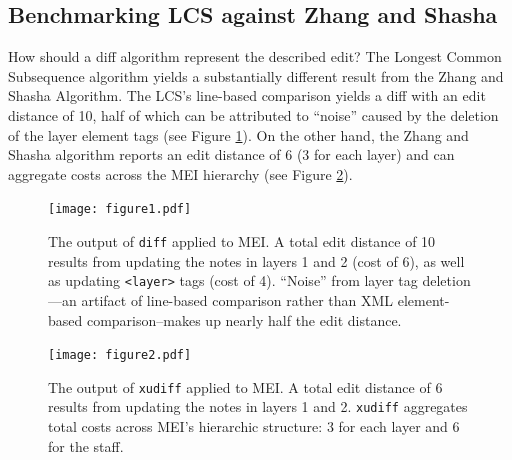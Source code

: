 \documentclass{article}
\begin{document}
\subsection{Benchmarking LCS against Zhang and Shasha}
How should a diff algorithm represent the described edit?
The Longest Common Subsequence algorithm yields a substantially different result from the Zhang and Shasha Algorithm.
The LCS's line-based comparison yields a diff with an edit distance of 10,
half of which can be attributed to ``noise'' caused by the deletion of the layer element tags (see Figure \ref{fig:lcs_diff}).
On the other hand, the Zhang and Shasha algorithm reports an edit distance of 6 (3 for each layer)
and can aggregate costs across the MEI hierarchy (see Figure \ref{fig:xudiff_diff}).

\begin{figure}[!htb]
\centering
\texttt{[image: figure1.pdf]}
\caption{The output of \texttt{diff} applied to MEI. A total edit distance of 10 results from updating the notes in layers 1 and 2 (cost of 6), as well as updating \texttt{<layer>} tags (cost of 4). ``Noise'' from layer tag deletion---an artifact of line-based comparison rather than XML element-based comparison--makes up nearly half the edit distance.}
\label{fig:lcs_diff}
\end{figure}

\begin{figure}[!htb]
\centering
\texttt{[image: figure2.pdf]}
\caption{The output of \texttt{xudiff} applied to MEI. A total edit distance of 6 results from updating the notes in layers 1 and 2. \texttt{xudiff} aggregates total costs across MEI's hierarchic structure: 3 for each layer and 6 for the staff.}
\label{fig:xudiff_diff}
\end{figure}

\end{document}
